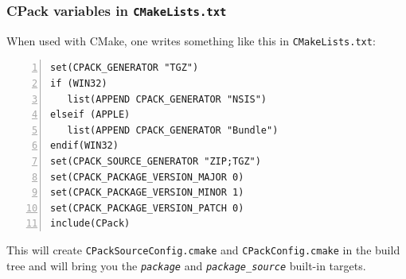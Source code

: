 \documentclass[compress,slidestop,table,usepdftitle=false
              ]
               {beamer}
\newcommand{\fname}[1]{\texttt{#1}}
\begin{document}
\begin{frame}[fragile]
\frametitle{CPack variables in \fname{CMakeLists.txt}}
When used with CMake, one writes something like this in \fname{CMakeLists.txt}:
\begin{lstlisting}[basicstyle=\scriptsize,numbers=left]
set(CPACK_GENERATOR "TGZ")
if (WIN32)
   list(APPEND CPACK_GENERATOR "NSIS")
elseif (APPLE)
   list(APPEND CPACK_GENERATOR "Bundle")
endif(WIN32)
set(CPACK_SOURCE_GENERATOR "ZIP;TGZ")
set(CPACK_PACKAGE_VERSION_MAJOR 0)
set(CPACK_PACKAGE_VERSION_MINOR 1)
set(CPACK_PACKAGE_VERSION_PATCH 0)
include(CPack)
\end{lstlisting}
This will create \fname{CPackSourceConfig.cmake} and \fname{CPackConfig.cmake}
in the build tree and will bring you the \emph{\fname{package}} and \emph{\fname{package\_source}}
built-in targets.
\end{frame}
\end{document}
